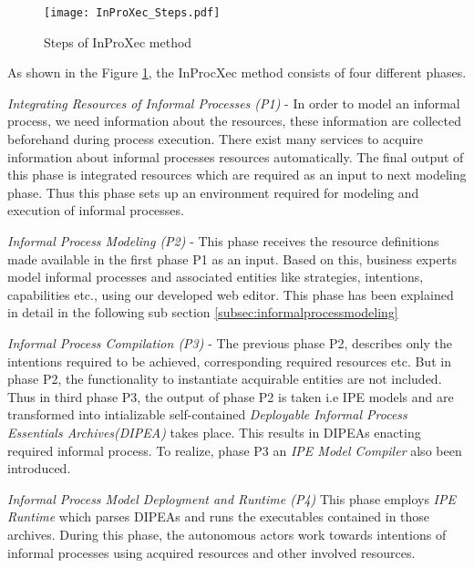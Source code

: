 \begin{figure}
	\centering
	\texttt{[image: InProXec\_Steps.pdf]}
	\caption{Steps of InProXec method \cite{Sungur2015}}
	\label{fig:inprocxec_steps}
\end{figure} 

As shown in the Figure \ref{fig:inprocxec_steps}, the InProcXec method consists of four different phases.

\textit{Integrating Resources of Informal Processes (P1)} - In order to model an informal process, we need information about the resources, these information are collected beforehand during process execution. There exist many services to acquire information about informal processes resources automatically. The final output of this phase is integrated resources which are required as an input to next modeling phase. Thus this phase sets up an environment required for modeling and execution of informal processes.  

\textit{Informal Process Modeling (P2)} - This phase receives the resource definitions made available in the first phase P1 as an input.  Based on this, business experts model informal processes and associated entities like strategies, intentions, capabilities etc., using our developed web editor. This phase has been explained in detail in the following sub section \ref{subsec:informalprocessmodeling}    

\textit{Informal Process Compilation (P3)} - The previous phase P2, describes only the intentions required to be achieved, corresponding required resources etc. But in phase P2, the functionality to instantiate acquirable entities are not included. Thus in third phase P3, the output of phase P2 is taken i.e IPE models and are transformed into intializable self-contained \textit{Deployable Informal Process Essentials Archives(DIPEA)} \cite{Sungur2015} takes place. This results in DIPEAs enacting required informal process. To realize, phase P3 an \textit{IPE Model Compiler} also been introduced. 

\textit{Informal Process Model Deployment and Runtime (P4)} This phase employs \textit{IPE Runtime} which parses DIPEAs and runs the executables contained in those archives. During this phase, the autonomous actors work towards intentions of informal processes using acquired resources and other involved resources.  

